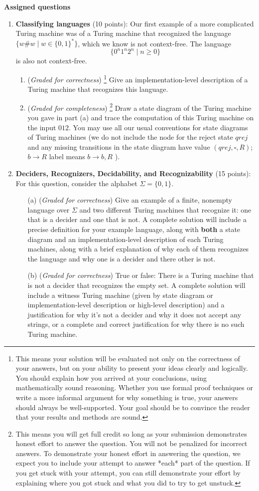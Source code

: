 \documentclass[12pt, oneside]{article}
\newcommand{\gradeCorrect}{({\it Graded for correctness}) }
\newcommand{\gradeCorrectFirst}{\gradeCorrect\footnote{This means your solution 
will be evaluated not only on the correctness of your answers, but on your ability
to present your ideas clearly and logically. You should explain how you 
arrived at your conclusions, using
mathematically sound reasoning. Whether you use formal proof techniques or 
write a more informal argument
for why something is true, your answers should always be well-supported. 
Your goal should be to convince the
reader that your results and methods are sound.} }
\newcommand{\gradeComplete}{({\it Graded for completeness}) }
\newcommand{\gradeCompleteFirst}{\gradeComplete\footnote{This means you will 
get full credit so long as your submission demonstrates honest effort to 
answer the question. You will not be penalized for incorrect answers. 
To demonstrate your honest effort in answering the question, we 
expect you to include your attempt to answer *each* part of the question. 
If you get stuck with your attempt, you can still demonstrate 
your effort by explaining where you got stuck and what 
you did to try to get unstuck.} }
\begin{document}
{\bf Assigned questions}
\begin{enumerate}[wide, labelwidth=!, labelindent=0pt]


\item\textbf{Classifying languages} (10 points):
Our first example of a more complicated Turing machine was of a Turing machine 
that recognized the language $\{w \# w \mid w \in\{0,1\}^*\}$, which we 
know is not context-free. The language
\[
    \{0^n 1^n 2^n \mid n \geq 0\}
\]
is also not context-free. 

\begin{enumerate}
    \item\gradeCorrectFirst Give an implementation-level description of a Turing machine 
    that recognizes this language.
    \item\gradeCompleteFirst Draw a state diagram of the Turing machine you gave in part (a) and trace
    the computation of this Turing machine on the input $012$. You may use all 
    our usual conventions for state diagrams of Turing machines 
    (we do not include the node for the reject state $qrej$ and any missing transitions 
    in the state diagram have value $(qrej,\square,R)$; 
    $b \to R$ label means $b \to b, R$ ).
\end{enumerate}


\item \textbf{Deciders, Recognizers, Decidability, and Recognizability} (15 points):
For this question, consider the alphabet $\Sigma = \{0,1\}$.
\begin{enumerate}
\item[(a)]\gradeCorrect Give an example of a finite, nonempty language over $\Sigma$ and 
two different Turing machines that recognize it: one that is a decider and one that is not.
A complete solution will include a precise definition for your example language, 
along with {\bf both} a state diagram and an implementation-level description 
of each Turing machines, along with a brief explanation of why each of them recognizes
the language and why one is a decider and there other is not.

\item[(b)]\gradeCorrect True or false: There is a Turing machine that is not a decider that recognizes 
the empty set. A complete solution will include a witness Turing machine (given by 
state diagram or implementation-level description or high-level description) and a justification 
for why it's not a decider and why it does not accept any strings, or a complete and correct
justification for why there is no such Turing machine.


\end{enumerate}
\end{enumerate}
\end{document}
